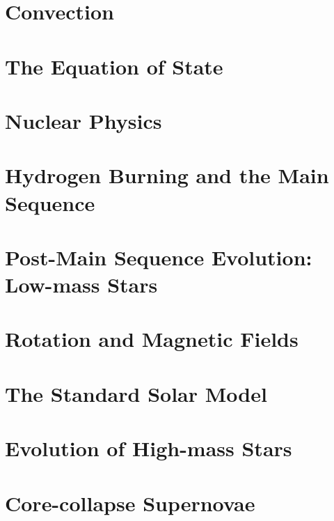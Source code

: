 \documentclass{astro-bookshelf}
\begin{document}
\chapter{Convection}\label{s.convection}


\chapter[Equation of State]{The Equation of State}\label{ch.equation-of-state}


\chapter{Nuclear Physics}


\chapter[Main Sequence]{Hydrogen Burning and the Main Sequence}


\chapter[Low-Mass Post-Main Sequence]{Post-Main Sequence Evolution: Low-mass Stars}


\chapter[Rotation and Magnetic Fields]{Rotation and Magnetic Fields}\label{ch.rotation}
%

\chapter[Standard Solar Model]{The Standard Solar Model}\label{ch.solarmodel}
%

\chapter[High-mass Stars]{Evolution of High-mass Stars}\label{ch.highmass}
%

\chapter[Core-collapse Supernovae]{Core-collapse Supernovae}\label{ch.ccsn}
%
\end{document}
